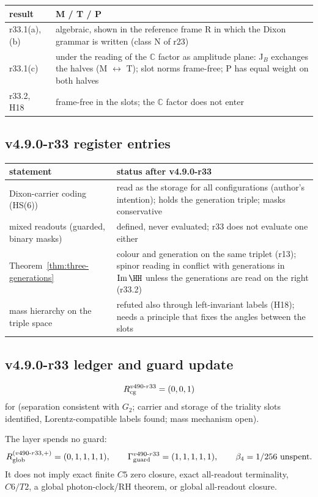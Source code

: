 \begin{center}
\small
\begin{tabular}{@{}>{\raggedright\arraybackslash}p{}>{\raggedright\arraybackslash}p{}@{}}
\toprule
result & M / T / P\\
\midrule
r33.1(a), (b) & algebraic, shown in the reference frame R in which the Dixon grammar is written (class N of r23)\\
r33.1(c) & under the reading of the \(\mathbb C\) factor as amplitude plane: J\(_B\) exchanges the halves (M \(\leftrightarrow\) T); slot norms frame-free; P has equal weight on both halves\\
r33.2, H18 & frame-free in the slots; the \(\mathbb C\) factor does not enter\\
\bottomrule
\end{tabular}
\end{center}

\subsection*{v4.9.0-r33 register entries}
\label{subsec:v490-r33-register}

\begin{center}
\small
\begin{tabular}{@{}>{\raggedright\arraybackslash}p{}>{\raggedright\arraybackslash}p{}@{}}
\toprule
statement & status after v4.9.0-r33\\
\midrule
Dixon-carrier coding (HS(6)) & read as the storage for all configurations (author's intention); holds the generation triple; masks conservative\\
mixed readouts (guarded, binary masks) & defined, never evaluated; r33 does not evaluate one either\\
Theorem~\ref{thm:three-generations} & colour and generation on the same triplet (r13); spinor reading in conflict with generations in \(\operatorname{Im}\HH\) unless the generations are read on the right (r33.2)\\
mass hierarchy on the triple space & refuted also through left-invariant labels (H18); needs a principle that fixes the angles between the slots\\
\bottomrule
\end{tabular}
\end{center}

\subsection*{v4.9.0-r33 ledger and guard update}
\label{subsec:v490-r33-ledger-guard}

\[
R_{\rm cg}^{v490\text{-}r33}=(0,0,1)
\]
for (separation consistent with \(G_2\); carrier and storage of the triality slots identified, Lorentz-compatible labels found;
mass mechanism open).

The layer spends no guard:
\[
R_{\rm glob}^{(v490\text{-}r33,+)}=(0,1,1,1,1),
\qquad
\Gamma_{\rm guard}^{v490\text{-}r33}=(1,1,1,1,1),
\qquad
\beta_4=1/256\ \text{unspent}.
\]
It does not imply exact finite \(C5\) zero closure, exact all-readout terminality,
\(C6/T2\), a global photon-clock/RH theorem, or global all-readout closure.
